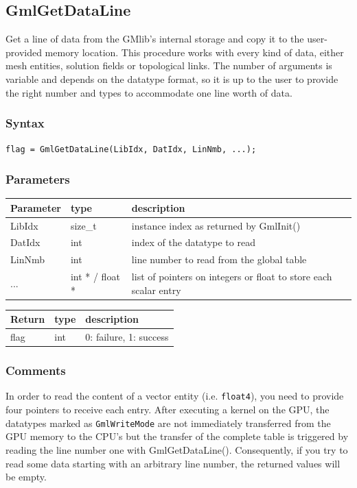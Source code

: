 \documentclass[a4paper,12pt]{article}
\begin{document}
\subsection{GmlGetDataLine}
Get a line of data from the GMlib's internal storage and copy it to the user-provided memory location. This procedure works with every kind of data, either mesh entities, solution fields or topological links. The number of arguments is variable and depends on the datatype format, so it is up to the user to provide the right number and types to accommodate one line worth of data.

\subsubsection*{Syntax}
{\tt flag = GmlGetDataLine(LibIdx, DatIdx, LinNmb, ...);}

\subsubsection*{Parameters}
\begin{tabular}{|m{2cm}|m{1.5cm}|m{10.5cm}|}
\hline
Parameter  & type            & description \\
\hline
LibIdx     & size\_t         & instance index as returned by GmlInit() \\
\hline
DatIdx     & int             & index of the datatype to read \\
\hline
LinNmb     & int             & line number to read from the global table \\
\hline
...        & int * / float * & list of pointers on integers or float to store each scalar entry \\
\hline
\end{tabular}

\medskip

\begin{tabular}{|m{2cm}|m{1.5cm}|m{10.5cm}|}
\hline
Return     & type   & description \\
\hline
flag       & int    & 0: failure, 1: success \\
\hline
\end{tabular}

\subsubsection*{Comments}
In order to read the content of a vector entity (i.e. {\tt float4}), you need to provide four pointers to receive each entry. After executing a kernel on the GPU, the datatypes marked as {\tt GmlWriteMode} are not immediately transferred from the GPU memory to the CPU's but the transfer of the complete table is triggered by reading the line number one with GmlGetDataLine(). Consequently, if you try to read some data starting with an arbitrary line number, the returned values will be empty.
\end{document}
